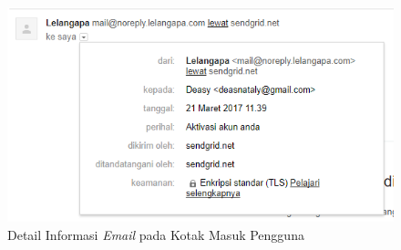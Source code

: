 	\indent 
	\begin{figure}[H]
		\centering
		\includegraphics[width=\textwidth]{images/bab4/pl/detail-whitelist.png}
		\caption{Detail Informasi \textit{Email} pada Kotak Masuk Pengguna}
		\label{detail-whitelist}
	\end{figure}
	